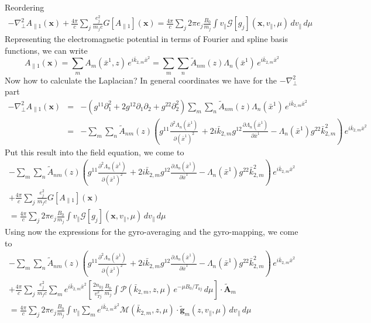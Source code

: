 Reordering
\begin{eqnarray*}
  -\nabla_\bot^2 A_{\|1}(\mathbf{x}) 
  +\frac{4\pi}{c}\sum_j\frac{e_j^2}{m_jc} G[A_{\|1}](\mathbf{x})
  = \frac{4\pi}{c}\sum_j 2\pi e_j\frac{B_0}{m_j}\int v_\| \mathcal{G}[g_j](\mathbf{x},v_\|,\mu)\,dv_\|\,d\mu
\end{eqnarray*}
Representing the electromagnetic potential in terms of Fourier and
spline basis functions, we can write
\begin{displaymath}
  A_{\|1}(\mathbf{x})=\sum_m A_m(\bar x^1,z)\,e^{i\bar{k}_{2,m}\bar x^2}
  =\sum_m \sum_n \tilde{A}_{nm}(z)\Lambda_n(\bar x^1)\,e^{i\bar{k}_{2,m}\bar x^2}
\end{displaymath}
Now how to calculate the Laplacian? In general coordinates we have for
the $-\nabla_\bot^2$ part
\begin{eqnarray*}
  -\nabla_\bot^2 A_{\|1}(\mathbf{x}) &=& -\left(
    g^{11}\partial_1^2+2g^{12}\partial_1\partial_2+g^{22}\partial_2^2
  \right) \sum_m \sum_n \tilde{A}_{nm}(z)\Lambda_n(\bar x^1)\,e^{i\bar{k}_{2,m}\bar x^2}\\
  &=&-\sum_m \sum_n \tilde{A}_{nm}(z) \left(
    g^{11}\frac{\partial^2\Lambda_n(\bar x^1)}{\partial(\bar x^1)^2}\,
    +2i\bar{k}_{2,m} g^{12}\frac{\partial\Lambda_n(\bar x^1)}{\partial\bar x^1}
    -\Lambda_n(\bar x^1) g^{22}\bar{k}_{2,m}^2
  \right) \,e^{i\bar{k}_{2,m}\bar x^2}
\end{eqnarray*}
Put this result into the field equation, we come to
\begin{multline*}
  -\sum_m \sum_n \tilde{A}_{nm}(z) \left(
    g^{11}\frac{\partial^2\Lambda_n(\bar x^1)}{\partial(\bar x^1)^2}\,
    +2i\bar{k}_{2,m} g^{12}\frac{\partial\Lambda_n(\bar x^1)}{\partial\bar x^1}
    -\Lambda_n(\bar x^1) g^{22}\bar{k}_{2,m}^2
  \right) \,e^{i\bar{k}_{2,m}\bar x^2}\\
  +\frac{4\pi}{c}\sum_j\frac{e_j^2}{m_jc} G[A_{\|1}](\mathbf{x})\\
  = \frac{4\pi}{c}\sum_j 2\pi e_j\frac{B_0}{m_j}\int v_\| \mathcal{G}[g_j](\mathbf{x},v_\|,\mu)\,dv_\|\,d\mu
\end{multline*}
Using now the expressions for the gyro-averaging and the gyro-mapping,
we come to
\begin{multline*}
  -\sum_m \sum_n \tilde{A}_{nm}(z) \left(
    g^{11}\frac{\partial^2\Lambda_n(\bar x^1)}{\partial(\bar x^1)^2}\,
    +2i\bar{k}_{2,m} g^{12}\frac{\partial\Lambda_n(\bar x^1)}{\partial\bar x^1}
    -\Lambda_n(\bar x^1) g^{22}\bar{k}_{2,m}^2
  \right) \,e^{i\bar{k}_{2,m}\bar x^2}\\
  +\frac{4\pi}{c}\sum_j\frac{e_j^2}{m_jc} \sum_m e^{i\bar k_{2,m}\bar x^2} 
  \left[\frac{2n_{0j}}{v_{Tj}^2}\frac{B_0}{m_j}\int \mathcal{P}(\bar{k}_{2,m},z,\mu)
    \,e^{-\mu B_0/T_{0j}}\,d\mu\right] \cdot\tilde{\mathbf{A}}_m\\
  = \frac{4\pi}{c}\sum_j 2\pi e_j \frac{B_0}{m_j}\int v_\| 
  \sum_m e^{i\bar k_{2,m}\bar x^2} \mathcal{M}(\bar{k}_{2,m},z,\mu)\cdot\tilde{\mathbf{g}}_m(z,v_\|,\mu)\,dv_\|\,d\mu
\end{multline*}
